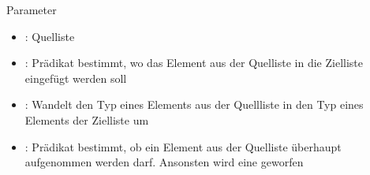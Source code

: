 \documentclass{../tuda-beamer}
\begin{document}
    \begin{frame}[c]{Parameter}
        \begin{itemize}
            \item {}: Quelliste
            \item {}: Prädikat bestimmt, wo
            das Element aus der Quelliste in die Zielliste eingefügt werden soll
            \item {}: Wandelt den Typ eines
            Elements aus der Quellliste in den Typ eines Elements der Zielliste um
            \item {}: Prädikat bestimmt, ob ein Element aus
            der Quelliste überhaupt aufgenommen werden darf. Ansonsten wird eine
             geworfen
        \end{itemize}
        \vspace{-.5em}
        
    \end{frame}
\end{document}
